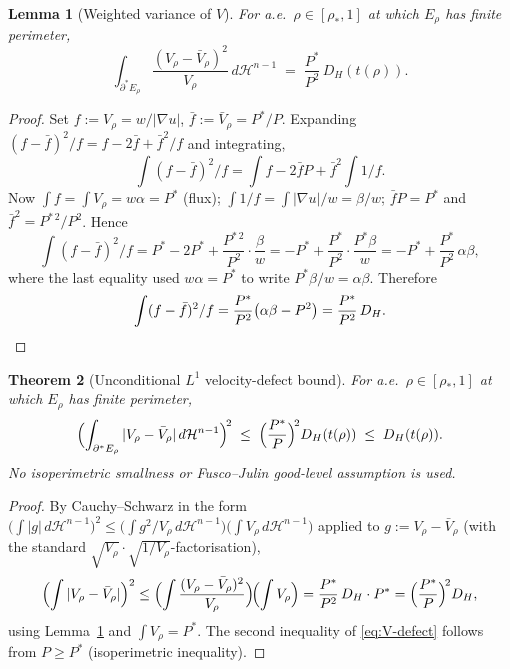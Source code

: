 \documentclass[11pt]{article}
\newtheorem{theorem}{Theorem}[section]
\newtheorem{lemma}[theorem]{Lemma}
\theoremstyle{definition}
\newcommand{\rstar}{\rho_{*}}
\newcommand{\Hn}{\mathcal H^{n-1}}
\begin{document}
\begin{lemma}[Weighted variance of $V$]\label{lem:V-weighted-var}
For a.e.\ $\rho\in[\rstar,1]$ at which $E_\rho$ has finite perimeter,
\begin{equation}\label{eq:V-weighted-id}
   \int_{\partial^{*}E_\rho}\frac{(V_\rho-\bar V_\rho)^{2}}{V_\rho}\,d\Hn
   \;=\;\frac{P^{*}}{P^{2}}\,D_H(t(\rho)).
\end{equation}
\end{lemma}

\begin{proof}
Set $f:=V_\rho=w/|\nabla u|$, $\bar f:=\bar V_\rho=P^{*}/P$.
Expanding $(f-\bar f)^{2}/f=f-2\bar f+\bar f^{2}/f$ and integrating,
\[
   \int(f-\bar f)^{2}/f
   =\int f-2\bar f P+\bar f^{2}\!\int 1/f.
\]
Now $\int f=\int V_\rho=w\alpha=P^{*}$ (flux);
$\int 1/f=\int|\nabla u|/w=\beta/w$;
$\bar f P=P^{*}$ and $\bar f^{2}=P^{*\,2}/P^{2}$.  Hence
\[
   \int(f-\bar f)^{2}/f
   =P^{*}-2P^{*}+\frac{P^{*\,2}}{P^{2}}\cdot\frac{\beta}{w}
   =-P^{*}+\frac{P^{*}}{P^{2}}\cdot\frac{P^{*}\beta}{w}
   =-P^{*}+\frac{P^{*}}{P^{2}}\,\alpha\beta,
\]
where the last equality used $w\alpha=P^{*}$ to write
$P^{*}\beta/w=\alpha\beta$.  Therefore
\[
   \int(f-\bar f)^{2}/f
   =\frac{P^{*}}{P^{2}}\bigl(\alpha\beta-P^{2}\bigr)
   =\frac{P^{*}}{P^{2}}\,D_H.\qedhere
\]
\end{proof}

\begin{theorem}[Unconditional $L^{1}$ velocity-defect bound]
\label{thm:V-defect}
For a.e.\ $\rho\in[\rstar,1]$ at which $E_\rho$ has finite perimeter,
\begin{equation}\label{eq:V-defect}
   \Bigl(\int_{\partial^{*}E_\rho}|V_\rho-\bar V_\rho|\,d\Hn\Bigr)^{\!2}
   \;\le\;\Bigl(\frac{P^{*}}{P}\Bigr)^{\!2}D_H(t(\rho))
   \;\le\;D_H(t(\rho)).
\end{equation}
No isoperimetric smallness or Fusco--Julin good-level assumption is
used.
\end{theorem}

\begin{proof}
By Cauchy--Schwarz in the form
$\bigl(\int|g|\,d\Hn\bigr)^{2}\le\bigl(\int g^{2}/V_\rho\,d\Hn\bigr)\bigl(\int V_\rho\,d\Hn\bigr)$
applied to $g:=V_\rho-\bar V_\rho$ (with the standard
$\sqrt{V_\rho}\cdot\sqrt{1/V_\rho}$-factorisation),
\[
   \Bigl(\int|V_\rho-\bar V_\rho|\Bigr)^{2}
   \le\Bigl(\int\frac{(V_\rho-\bar V_\rho)^{2}}{V_\rho}\Bigr)\!\Bigl(\int V_\rho\Bigr)
   =\frac{P^{*}}{P^{2}}\,D_H\cdot P^{*}
   =\Bigl(\frac{P^{*}}{P}\Bigr)^{\!2}D_H,
\]
using Lemma~\ref{lem:V-weighted-var} and $\int V_\rho=P^{*}$.  The
second inequality of \eqref{eq:V-defect} follows from
$P\ge P^{*}$ (isoperimetric inequality).
\end{proof}
\end{document}
